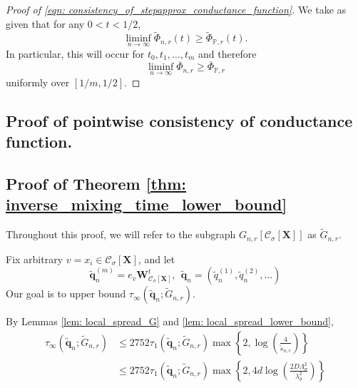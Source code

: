 \documentclass{article}
\newcommand{\1}{\mathbf{1}}
\newcommand{\qbf}{\mathbf{q}}
\newcommand{\Xbf}{\mathbf{X}}
\newcommand{\Wbf}{\mathbf{W}}
\newcommand{\Pbb}{\mathbb{P}}
\newcommand{\Cset}{\mathcal{C}}
\newcommand{\Csig}{\Cset_{\sigma}}
\theoremstyle{aldenthm}
\begin{document}
\begin{proof}[Proof of \eqref{eqn: consistency_of_stepapprox_conductance_function}]
	We take as given that for any $0 < t < 1/2$,
	\begin{equation*}
	\liminf_{n \to \infty} \widetilde{\Phi}_{n,r}(t) \geq \widetilde{\Phi}_{\Pbb,r}(t).
	\end{equation*}
	In particular, this will occur for $t_0, t_1, \ldots, t_m$ and therefore
	\begin{equation*}
	\liminf_{n \to \infty} \overline{\Phi}_{n,r} \geq \overline{\Phi}_{\Pbb,r}
	\end{equation*}
	uniformly over $[1/m,1/2]$.
\end{proof}

\subsection{Proof of pointwise consistency of conductance function.}
\label{subsection: proof_of_pointwise consitency_of_conductance_function}


\subsection{Proof of Theorem \ref{thm: inverse_mixing_time_lower_bound}}
Throughout this proof, we will refer to the subgraph $G_{n,r}\left[\Csig[\Xbf]\right]$ as $\widetilde{G}_{n,r}$.

Fix arbitrary $v = x_i \in \Csig[\Xbf]$, and let
\begin{equation*}
\widetilde{\qbf}_n^{(m)} = e_v \Wbf_{\Csig[\Xbf]}^t, ~~ \widetilde{\qbf}_n = (\widetilde{q}_n^{(1)}, \widetilde{q}_n^{(2)}, \ldots)
\end{equation*}
Our goal is to upper bound $\tau_{\infty}(\widetilde{\qbf}_n; \widetilde{G}_{n,r})$.

By Lemmas \ref{lem: local_spread_G} and \ref{lem: local_spread_lower_bound},
\begin{align*}
\tau_{\infty}(\widetilde{\qbf}_n; \widetilde{G}_{n,r}) & \leq 2752 \tau_{1}(\widetilde{\qbf}_n; \widetilde{G}_{n,r}) \max\left\{2, \log\left(\frac{4}{\widetilde{s}_{n,r}}\right) \right\} \nonumber \\
& \leq 2752 \tau_{1}(\widetilde{\qbf}_n; \widetilde{G}_{n,r}) \max\left\{2, 4d\log\left(\frac{2D \Lambda_{\sigma}^2}{\lambda_{\sigma}^2}\right) \right\}
\end{align*} 
\end{document}

